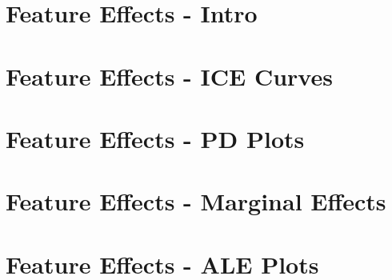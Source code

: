 \documentclass[11pt,compress,t,notes=noshow, aspectratio=169, xcolor=table]{beamer}
\begin{document}



\section{Feature Effects - Intro}


\section{Feature Effects - ICE Curves}


\section{Feature Effects - PD Plots}



\section{Feature Effects - Marginal Effects}


\section{Feature Effects - ALE Plots}


\end{document}
